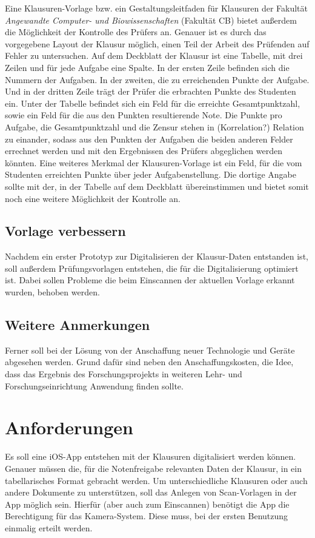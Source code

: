 \documentclass[nomenclature, onesided, 150]{HSMW-Thesis}
\begin{document}
	Eine Klausuren-Vorlage bzw. ein Gestaltungsleitfaden für Klausuren der Fakultät \textit{Angewandte Computer- und Biowissenschaften} (Fakultät CB) bietet außerdem die Möglichkeit der Kontrolle des Prüfers an. Genauer ist es durch das vorgegebene Layout der Klausur möglich, einen Teil der Arbeit des Prüfenden auf Fehler zu untersuchen. Auf dem Deckblatt der Klausur ist eine Tabelle, mit drei Zeilen und für jede Aufgabe eine Spalte. In der ersten Zeile befinden sich die Nummern der Aufgaben. In der zweiten, die zu erreichenden Punkte der Aufgabe. Und in der dritten Zeile trägt der Prüfer die erbrachten Punkte des Studenten ein. Unter der Tabelle befindet sich ein Feld für die erreichte Gesamtpunktzahl, sowie ein Feld für die aus den Punkten resultierende Note. Die Punkte pro Aufgabe, die Gesamtpunktzahl und die Zensur stehen in (Korrelation?) Relation zu einander, sodass aus den Punkten der Aufgaben die beiden anderen Felder errechnet werden und mit den Ergebnissen des Prüfers abgeglichen werden könnten. Eine weiteres Merkmal der Klausuren-Vorlage ist ein Feld, für die vom Studenten erreichten Punkte über jeder Aufgabenstellung. Die dortige Angabe sollte mit der, in der Tabelle auf dem Deckblatt übereinstimmen und bietet somit noch eine weitere Möglichkeit der Kontrolle an.
	
	\section{Vorlage verbessern}
	Nachdem ein erster Prototyp zur Digitalisieren der Klausur-Daten entstanden ist, soll außerdem Prüfungsvorlagen entstehen, die für die Digitalisierung optimiert ist. Dabei sollen Probleme die beim Einscannen der aktuellen Vorlage erkannt wurden, behoben werden. 
	
	\section{Weitere Anmerkungen}
	Ferner soll bei der Lösung von der Anschaffung neuer Technologie und Geräte abgesehen werden. Grund dafür sind neben den Anschaffungskosten, die Idee, dass das Ergebnis des Forschungsprojekts in weiteren Lehr- und Forschungseinrichtung Anwendung finden sollte.


\chapter{Anforderungen}
	Es soll eine iOS-App entstehen mit der Klausuren digitalisiert werden können. Genauer müssen die, für die Notenfreigabe relevanten Daten der Klausur, in ein tabellarisches Format gebracht werden. Um unterschiedliche Klausuren oder auch andere Dokumente zu unterstützen, soll das Anlegen von Scan-Vorlagen in der App möglich sein. Hierfür (aber auch zum Einscannen) benötigt die App die Berechtigung für das Kamera-System. Diese muss, bei der ersten Benutzung einmalig erteilt werden.
	
\end{document}
